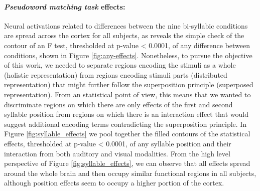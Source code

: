 \paragraph{\emph{Pseudoword matching task} effects:}
Neural activations related to differences between the nine bi-syllabic conditions are spread across the cortex for all subjects, as reveals the simple check of the contour of an F test, thresholded at p-value < 0.0001, of any difference between conditions, shown in Figure \ref{fig:any-effects}.
Nonetheless, to pursue the objective of this work, we needed to separate regions encoding the stimuli as a whole (holistic representation) from regions encoding stimuli parts (distributed representation) that might further follow the superposition principle (superposed representation).
From an statistical point of view, this means that we wanted to discriminate regions on which there are only effects of the first and second syllable position from regions on which there is an interaction effect that would suggest additional encoding terms contradicting the superposition principle.
In Figure \ref{fig:syllable_effects} we pool together the filled contours of the statistical effects, thresholded at p-value < 0.0001, of any syllable position and their interaction from both auditory and visual modalities.
From the high level perspective of Figure \ref{fig:syllable_effects}, we can observe that all effects spread around the whole brain and then occupy similar functional regions in all subjects, although position effects seem to occupy a higher portion of the cortex.

